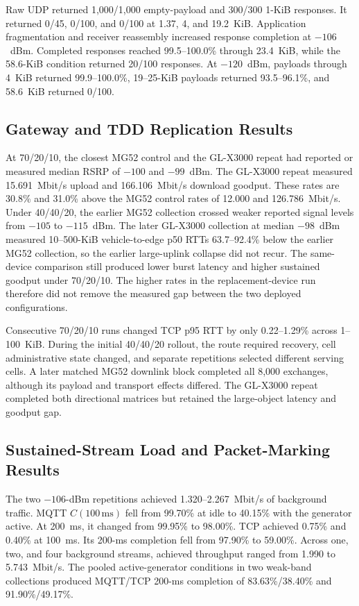 Raw UDP returned 1,000/1,000 empty-payload and 300/300 1-KiB responses. It
returned 0/45, 0/100, and 0/100 at 1.37, 4, and 19.2~KiB. Application
fragmentation and receiver reassembly increased response completion at
$-106$~dBm. Completed responses reached 99.5--100.0\% through 23.4~KiB, while
the 58.6-KiB condition returned 20/100 responses. At $-120$~dBm, payloads
through 4~KiB returned 99.9--100.0\%, 19--25-KiB payloads returned
93.5--96.1\%, and 58.6~KiB returned 0/100.

\subsection{Gateway and TDD Replication Results}

At 70/20/10, the closest MG52 control and the GL-X3000 repeat had reported or
measured median RSRP of $-100$ and $-99$~dBm. The GL-X3000 repeat measured
15.691~Mbit/s upload and 166.106~Mbit/s download goodput. These rates are
30.8\% and 31.0\% above the MG52 control rates of 12.000 and
126.786~Mbit/s. Under 40/40/20, the earlier MG52 collection crossed weaker
reported signal levels from $-105$ to $-115$~dBm. The later GL-X3000
collection at median $-98$~dBm measured 10--500-KiB vehicle-to-edge p50 RTTs
63.7--92.4\% below the earlier MG52 collection, so the earlier large-uplink
collapse did not recur. The same-device comparison still produced lower burst
latency and higher sustained goodput under 70/20/10. The higher rates in the
replacement-device run therefore did not remove the measured gap between the
two deployed configurations.

Consecutive 70/20/10 runs changed TCP p95 RTT by only 0.22--1.29\% across
1--100~KiB. During the initial 40/40/20 rollout, the route required recovery,
cell administrative state changed, and separate repetitions selected different
serving cells. A later matched MG52 downlink block completed all 8,000
exchanges, although its payload and transport effects differed. The GL-X3000
repeat completed both directional matrices but retained the large-object
latency and goodput gap.

\subsection{Sustained-Stream Load and Packet-Marking Results}

The two $-106$-dBm repetitions achieved 1.320--2.267~Mbit/s of background
traffic. MQTT $C(100\,\mathrm{ms})$ fell from 99.70\% at idle to 40.15\% with
the generator active. At 200~ms, it changed from 99.95\% to 98.00\%. TCP
achieved 0.75\% and 0.40\% at 100~ms. Its 200-ms completion fell from 97.90\%
to 59.00\%. Across one, two, and four background streams, achieved throughput
ranged from 1.990 to 5.743~Mbit/s. The pooled active-generator conditions in
two weak-band collections produced MQTT/TCP 200-ms completion of
83.63\%/38.40\% and 91.90\%/49.17\%.

